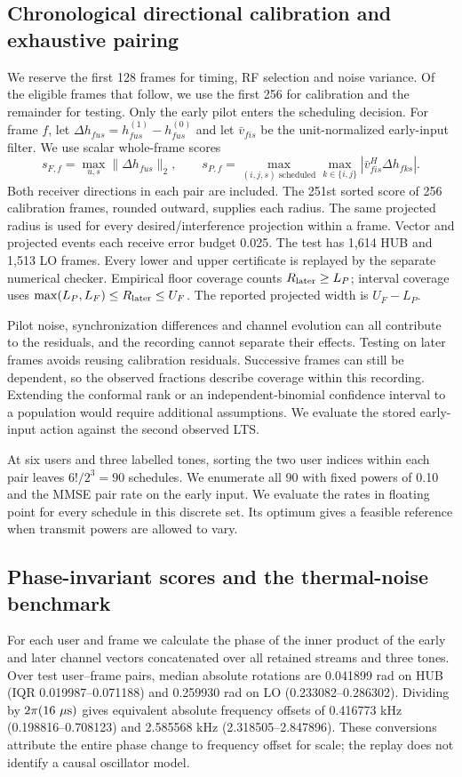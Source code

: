 \documentclass[10pt,letterpaper]{article}
\begin{document}
\subsection*{Chronological directional calibration and exhaustive pairing}
We reserve the first 128 frames for timing, RF selection and noise variance. Of the eligible frames that follow, we use the first 256 for calibration and the remainder for testing. Only the early pilot enters the scheduling decision. For frame $f$, let $\Delta h_{fus}=h^{(1)}_{fus}-h^{(0)}_{fus}$ and let $\bar v_{fis}$ be the unit-normalized early-input filter. We use scalar whole-frame scores
\[
 s_{F,f}=\max_{u,s}\|\Delta h_{fus}\|_2,\qquad
 s_{P,f}=\max_{(i,j,s)\text{ scheduled}}\max_{k\in\{i,j\}}
 |\bar v_{fis}^{H}\Delta h_{fks}|.
\]
Both receiver directions in each pair are included. The 251st sorted score of 256 calibration frames, rounded outward, supplies each radius. The same projected radius is used for every desired/interference projection within a frame. Vector and projected events each receive error budget 0.025. The test has 1,614 HUB and 1,513 LO frames. Every lower and upper certificate is replayed by the separate numerical checker. Empirical floor coverage counts $R_{\rm later}\geq L_P$; interval coverage uses $\max(L_P,L_F)\leq R_{\rm later}\leq U_F$. The reported projected width is $U_F-L_P$.

Pilot noise, synchronization differences and channel evolution can all contribute to the residuals, and the recording cannot separate their effects. Testing on later frames avoids reusing calibration residuals. Successive frames can still be dependent, so the observed fractions describe coverage within this recording. Extending the conformal rank or an independent-binomial confidence interval to a population would require additional assumptions. We evaluate the stored early-input action against the second observed LTS.

At six users and three labelled tones, sorting the two user indices within each pair leaves $6!/2^3=90$ schedules. We enumerate all 90 with fixed powers of 0.10 and the MMSE pair rate on the early input. We evaluate the rates in floating point for every schedule in this discrete set. Its optimum gives a feasible reference when transmit powers are allowed to vary.


\subsection*{Phase-invariant scores and the thermal-noise benchmark}
For each user and frame we calculate the phase of the inner product of the early and later channel vectors concatenated over all retained streams and three tones. Over test user--frame pairs, median absolute rotations are 0.041899 rad on HUB (IQR 0.019987--0.071188) and 0.259930 rad on LO (0.233082--0.286302). Dividing by \(2\pi(16~\mu{\rm s})\) gives equivalent absolute frequency offsets of 0.416773 kHz (0.198816--0.708123) and 2.585568 kHz (2.318505--2.847896). These conversions attribute the entire phase change to frequency offset for scale; the replay does not identify a causal oscillator model.
\end{document}
